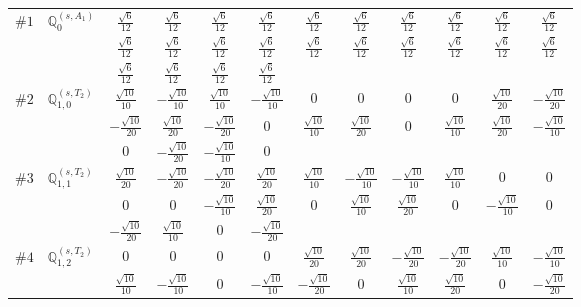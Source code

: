 \documentclass[fleqn,9pt,landscape]{jsarticle}
\begin{document}
\begin{center}
\begin{longtable}{lcccccccccc}
$ \#1\quad \mathbb{Q}_{0}^{(s,A_{1})} $ & $ \frac{\sqrt{6}}{12} $ & $ \frac{\sqrt{6}}{12} $ & $ \frac{\sqrt{6}}{12} $ & $ \frac{\sqrt{6}}{12} $ & $ \frac{\sqrt{6}}{12} $ & $ \frac{\sqrt{6}}{12} $ & $ \frac{\sqrt{6}}{12} $ & $ \frac{\sqrt{6}}{12} $ & $ \frac{\sqrt{6}}{12} $ & $ \frac{\sqrt{6}}{12} $ \\
& $ \frac{\sqrt{6}}{12} $ & $ \frac{\sqrt{6}}{12} $ & $ \frac{\sqrt{6}}{12} $ & $ \frac{\sqrt{6}}{12} $ & $ \frac{\sqrt{6}}{12} $ & $ \frac{\sqrt{6}}{12} $ & $ \frac{\sqrt{6}}{12} $ & $ \frac{\sqrt{6}}{12} $ & $ \frac{\sqrt{6}}{12} $ & $ \frac{\sqrt{6}}{12} $ \\
& $ \frac{\sqrt{6}}{12} $ & $ \frac{\sqrt{6}}{12} $ & $ \frac{\sqrt{6}}{12} $ & $ \frac{\sqrt{6}}{12} $ & $  $ & $  $ & $  $ & $  $ & $  $ & $  $ \\ \hline
$ \#2\quad \mathbb{Q}_{1,0}^{(s,T_{2})} $ & $ \frac{\sqrt{10}}{10} $ & $ - \frac{\sqrt{10}}{10} $ & $ \frac{\sqrt{10}}{10} $ & $ - \frac{\sqrt{10}}{10} $ & $ 0 $ & $ 0 $ & $ 0 $ & $ 0 $ & $ \frac{\sqrt{10}}{20} $ & $ - \frac{\sqrt{10}}{20} $ \\
& $ - \frac{\sqrt{10}}{20} $ & $ \frac{\sqrt{10}}{20} $ & $ - \frac{\sqrt{10}}{20} $ & $ 0 $ & $ \frac{\sqrt{10}}{10} $ & $ \frac{\sqrt{10}}{20} $ & $ 0 $ & $ \frac{\sqrt{10}}{10} $ & $ \frac{\sqrt{10}}{20} $ & $ - \frac{\sqrt{10}}{10} $ \\
& $ 0 $ & $ - \frac{\sqrt{10}}{20} $ & $ - \frac{\sqrt{10}}{10} $ & $ 0 $ & $  $ & $  $ & $  $ & $  $ & $  $ & $  $ \\ \hline
$ \#3\quad \mathbb{Q}_{1,1}^{(s,T_{2})} $ & $ \frac{\sqrt{10}}{20} $ & $ - \frac{\sqrt{10}}{20} $ & $ - \frac{\sqrt{10}}{20} $ & $ \frac{\sqrt{10}}{20} $ & $ \frac{\sqrt{10}}{10} $ & $ - \frac{\sqrt{10}}{10} $ & $ - \frac{\sqrt{10}}{10} $ & $ \frac{\sqrt{10}}{10} $ & $ 0 $ & $ 0 $ \\
& $ 0 $ & $ 0 $ & $ - \frac{\sqrt{10}}{10} $ & $ \frac{\sqrt{10}}{20} $ & $ 0 $ & $ \frac{\sqrt{10}}{10} $ & $ \frac{\sqrt{10}}{20} $ & $ 0 $ & $ - \frac{\sqrt{10}}{10} $ & $ 0 $ \\
& $ - \frac{\sqrt{10}}{20} $ & $ \frac{\sqrt{10}}{10} $ & $ 0 $ & $ - \frac{\sqrt{10}}{20} $ & $  $ & $  $ & $  $ & $  $ & $  $ & $  $ \\ \hline
$ \#4\quad \mathbb{Q}_{1,2}^{(s,T_{2})} $ & $ 0 $ & $ 0 $ & $ 0 $ & $ 0 $ & $ \frac{\sqrt{10}}{20} $ & $ \frac{\sqrt{10}}{20} $ & $ - \frac{\sqrt{10}}{20} $ & $ - \frac{\sqrt{10}}{20} $ & $ \frac{\sqrt{10}}{10} $ & $ - \frac{\sqrt{10}}{10} $ \\
& $ \frac{\sqrt{10}}{10} $ & $ - \frac{\sqrt{10}}{10} $ & $ 0 $ & $ - \frac{\sqrt{10}}{10} $ & $ - \frac{\sqrt{10}}{20} $ & $ 0 $ & $ \frac{\sqrt{10}}{10} $ & $ \frac{\sqrt{10}}{20} $ & $ 0 $ & $ - \frac{\sqrt{10}}{20} $ \\

\end{longtable}
\end{center}
\end{document}
